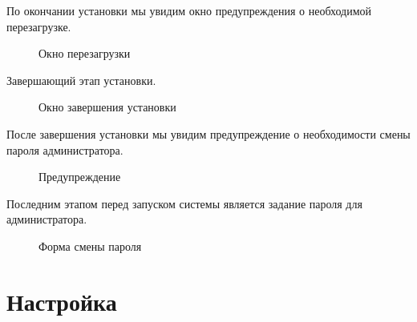 \clearpage
По окончании установки мы увидим окно предупреждения о необходимой перезагрузке.
\begin{figure}[H]
\caption{Окно перезагрузки}
\label{igas8}
\end{figure}
\clearpage
Завершающий этап установки.
\begin{figure}[H]
\caption{Окно завершения установки}
\label{igas9}
\end{figure}
\clearpage
После завершения установки мы увидим предупреждение о необходимости смены пароля администратора.
\begin{figure}[H]
\caption{Предупреждение}
\label{igas10}
\end{figure}
\clearpage
Последним этапом перед запуском системы является задание пароля для администратора.
\begin{figure}[H]
\caption{Форма смены пароля}
\label{igas11}
\end{figure}

\section{Настройка}
